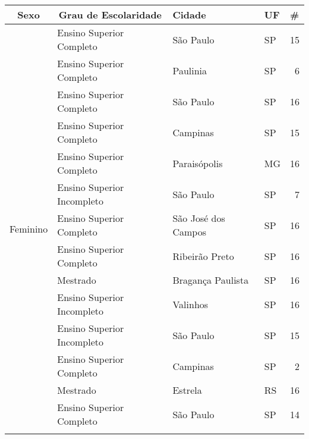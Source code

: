 \begin{table}[h]
\begin{tabular}{|l|l|l|l|r|}
\hline
\multicolumn{1}{|c|}{Sexo} & \multicolumn{1}{c|}{Grau de Escolaridade} & Cidade              & UF & \multicolumn{1}{l|}{\#} \\ \hline
\multirow{32}{*}{Feminino} & Ensino Superior Completo                  & São Paulo           & SP & 15                      \\ \cline{2-5} 
                           & Ensino Superior Completo                  & Paulinia            & SP & 6                       \\ \cline{2-5} 
                           & Ensino Superior Completo                  & São Paulo           & SP & 16                      \\ \cline{2-5} 
                           & Ensino Superior Completo                  & Campinas            & SP & 15                      \\ \cline{2-5} 
                           & Ensino Superior Completo                  & Paraisópolis        & MG & 16                      \\ \cline{2-5} 
                           & Ensino Superior Incompleto                & São Paulo           & SP & 7                       \\ \cline{2-5} 
                           & Ensino Superior Completo                  & São José dos Campos & SP & 16                      \\ \cline{2-5} 
                           & Ensino Superior Completo                  & Ribeirão Preto      & SP & 16                      \\ \cline{2-5} 
                           & Mestrado                                  & Bragança Paulista   & SP & 16                      \\ \cline{2-5} 
                           & Ensino Superior Incompleto                & Valinhos            & SP & 16                      \\ \cline{2-5} 
                           & Ensino Superior Incompleto                & São Paulo           & SP & 15                      \\ \cline{2-5} 
                           & Ensino Superior Completo                  & Campinas            & SP & 2                       \\ \cline{2-5} 
                           & Mestrado                                  & Estrela             & RS & 16                      \\ \cline{2-5} 
                           & Ensino Superior Completo                  & São Paulo           & SP & 14                      \\ \cline{2-5} 

\end{tabular}
\end{table}
